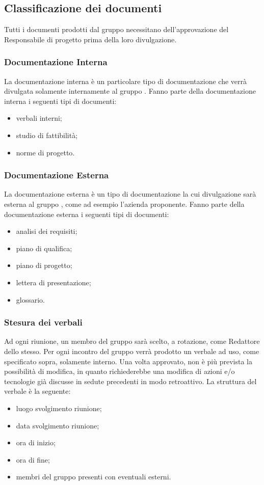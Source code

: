 \subsection{Classificazione dei documenti}
Tutti i documenti prodotti dal gruppo {\Gruppo} necessitano dell’approvazione del Responsabile di progetto prima della loro divulgazione.

\subsubsection{Documentazione Interna}
La documentazione interna è un particolare tipo di documentazione che verrà divulgata solamente internamente al gruppo {\Gruppo}. Fanno parte della documentazione interna i seguenti tipi di documenti:
\begin{itemize}
	\item verbali interni;
	\item studio di fattibilità;
	\item norme di progetto.
\end{itemize}

\subsubsection{Documentazione Esterna}
La documentazione esterna è un tipo di documentazione la cui divulgazione sarà esterna al gruppo {\Gruppo}, come ad esempio l'azienda proponente. Fanno parte della documentazione esterna i seguenti tipi di documenti:
\begin{itemize}
	\item analisi dei requisiti;
	\item piano di qualifica;
	\item piano di progetto;
	\item lettera di presentazione;
	\item glossario.
\end{itemize}

\subsubsection{Stesura dei verbali}
Ad ogni riunione, un membro del gruppo {\Gruppo} sarà scelto, a rotazione, come Redattore dello stesso. Per ogni incontro del gruppo verrà prodotto un verbale ad uso, come specificato sopra, solamente interno. Una volta approvato, non è più prevista la possibilità di modifica, in quanto richiederebbe una modifica di azioni e/o tecnologie già discusse in sedute precedenti in modo retroattivo. La struttura del verbale è la seguente:
\begin{itemize}
	\item luogo svolgimento riunione;
	\item data svolgimento riunione;
	\item ora di inizio;
	\item ora di fine;
	\item membri del gruppo presenti con eventuali esterni.
\end{itemize}

